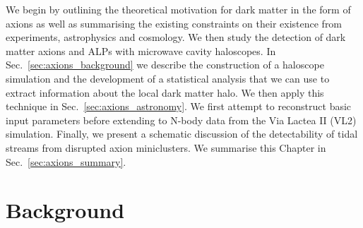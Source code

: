 We begin by outlining the theoretical motivation for dark matter in the form of axions as well as summarising the existing constraints on their existence from experiments, astrophysics and cosmology. We then study the detection of dark matter axions and ALPs with microwave cavity haloscopes. In Sec.~\ref{sec:axions_background} we describe the construction of a haloscope simulation and the development of a statistical analysis that we can use to extract information about the local dark matter halo. We then apply this technique in Sec.~\ref{sec:axions_astronomy}. We first attempt to reconstruct basic input parameters before extending to N-body data from the Via Lactea II (VL2)~\cite{Diemand:2007qr} simulation. Finally, we present a schematic discussion of the detectability of tidal streams from disrupted axion miniclusters. We summarise this Chapter in Sec.~\ref{sec:axions_summary}. 

\section{Background}
